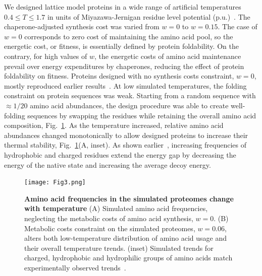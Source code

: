 \documentclass[10pt,letterpaper]{article}
\begin{document}
We designed lattice model proteins in a wide range of artificial temperatures $0.4\leq T\leq 1.7$ in units of Miyazawa-Jernigan residue level potential (p.u.)~\cite{Miyazawa1999SelfConsistent}. The chaperone-adjusted synthesis cost was varied from $w=0$ to $w=0.15$. The case of $w=0$ corresponds to zero cost of maintaining the amino acid pool, so the energetic cost, or fitness, is essentially defined by protein foldability. On the contrary, for high values of $w$, the energetic costs of amino acid maintenance prevail over energy expenditures by chaperones, reducing the effect of protein foldability on fitness. Proteins designed with no synthesis costs constraint, $w=0$, mostly reproduced earlier results~\cite{Berezovsky2007Positive,Venev2015Massively}. At low simulated temperatures, the folding constraint on protein sequences was weak. Starting from a random sequence with $\approx 1/20$ amino acid abundances, the design procedure was able to create well-folding sequences by swapping the residues while retaining the overall amino acid composition, Fig.~\ref{fig:fig3}. As the temperature increased, relative amino acid abundances changed monotonically to allow designed proteins to increase their thermal stability, Fig.~\ref{fig:fig3}(A, inset). As shown earlier~\cite{Berezovsky2007Positive}, increasing frequencies of hydrophobic and charged residues extend the energy gap by decreasing the energy of the native state and increasing the average decoy energy. 

\begin{figure}[h!]
\texttt{[image: Fig3.png]}
\caption{
{\bf Amino acid frequencies in the simulated proteomes change with temperature} (A) Simulated amino acid frequencies, neglecting the metabolic costs of amino acid synthesis, $w=0$.  (B) Metabolic costs constraint on the simulated proteomes, $w=0.06$, alters both low-temperature distribution of amino acid usage and their overall temperature trends. (inset) Simulated trends for charged, hydrophobic and hydrophilic groups of amino acids match experimentally observed trends~\cite{Berezovsky2007Positive}.
}
\label{fig:fig3}
\end{figure}
\end{document}
